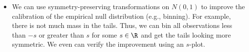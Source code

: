 \documentclass[12pt]{article}
\begin{document}
\begin{itemize}
\item We can use symmetry-preserving transformations on $N(0,1)$ to improve the calibration of the empirical null distribution (e.g., binning). For example, there is not much mass in the tails. Thus, we can bin all observations less than $-s$ or greater than $s$ for some $s \in \R$ and get the tails looking more symmetric. We even can verify the improvement using an $s$-plot.

\end{itemize}



\end{document}
